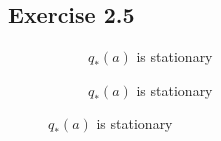 \documentclass[10pt]{article}
\begin{document}
	\subsection*{Exercise 2.5}
	\label{ss:2.5}
	\begin{figure}[H]
		\centering
		\begin{subfigure}{0.45\textwidth}
			\caption{$q_{*}(a)$ is stationary}
		\end{subfigure}
		\begin{subfigure}{0.45\textwidth}
			\caption{$q_{*}(a)$ is stationary}

\end{subfigure}
\end{figure}
\end{document}
